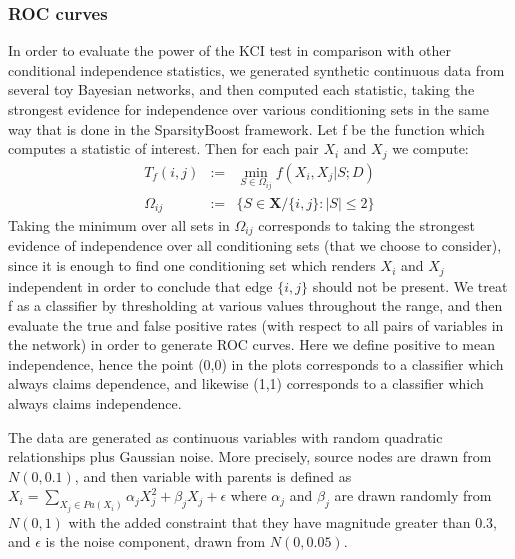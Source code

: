 \documentclass{article} %
\begin{document}
\subsubsection{ROC curves}
In order to evaluate the power of the KCI test in comparison with other conditional independence statistics, we generated synthetic continuous data from several toy Bayesian networks, and then computed each statistic, taking the strongest evidence for independence over various conditioning sets in the same way that is done in the SparsityBoost framework.  Let f be the function which computes a statistic of interest. Then for each pair $X_i$ and $X_j$ we compute:  \begin{eqnarray*} T_f(i,j) &:=& \min_{S \in \Omega_{ij} } f(X_i,X_j | S; D) \\ \Omega_{ij} &:=& \{ S \in \mathbf{X} / \{i,j\} : |S| \leq 2 \} \end{eqnarray*}  Taking the minimum over all sets in $\Omega_{ij}$ corresponds to taking the strongest evidence of independence over all conditioning sets (that we choose to consider), since it is enough to find one conditioning set which renders $X_i$ and $X_j$ independent in order to conclude that edge $\{i,j\}$ should not be present.  We treat f as a classifier by thresholding at various values throughout the range, and then evaluate the true and false positive rates (with respect to all pairs of variables in the network) in order to generate ROC curves.  Here we define positive to mean independence, hence the point (0,0) in the plots corresponds to a classifier which always claims dependence, and likewise (1,1) corresponds to a classifier which always claims independence.

The data are generated as continuous variables with random quadratic relationships plus Gaussian noise.  More precisely, source nodes are drawn from $N(0, 0.1)$, and then variable with parents is defined as $X_i = \sum_{X_j \in Pa(X_i)} \alpha_j X_j^2 + \beta_j X_j + \epsilon $ where $\alpha_j$ and $\beta_j$ are drawn randomly from $N(0, 1)$ with the added constraint that they have magnitude greater than 0.3, and $\epsilon$ is the noise component, drawn from $N(0, 0.05)$.  
\end{document}
